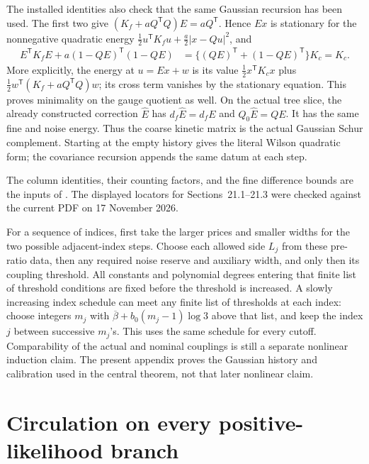 \documentclass[11pt,reqno]{amsart}
\numberwithin{equation}{section}
\theoremstyle{definition}
\theoremstyle{remark}
\begin{document}
The installed identities also check that the same Gaussian
recursion has been used. The first two give
\((K_f+aQ^{\mathsf T}Q)E=aQ^{\mathsf T}\). Hence \(Ex\) is stationary for
the nonnegative quadratic energy
\(\frac12u^{\mathsf T}K_fu+\frac a2|x-Qu|^2\), and
\begin{align*}
 E^{\mathsf T}K_fE+a(1-QE)^{\mathsf T}(1-QE)
 &=\{(QE)^{\mathsf T}+(1-QE)^{\mathsf T}\}K_c=K_c.
\end{align*}
More explicitly, the energy at \(u=Ex+w\) is its value
\(\frac12x^{\mathsf T}K_cx\) plus
\(\frac12w^{\mathsf T}(K_f+aQ^{\mathsf T}Q)w\); its cross term vanishes
by the stationary equation. This proves minimality on
the gauge quotient as well. On the actual tree slice,
the already constructed correction \(\widehat E\) has
\(d_f\widehat E=d_fE\) and \(Q_0\widehat E=QE\).
It has the same fine and noise energy. Thus the coarse
kinetic matrix is the actual Gaussian Schur complement.
Starting at the empty history gives the literal Wilson
quadratic form; the covariance recursion appends the
same datum at each step.

The column identities, their counting factors, and the
fine difference bounds are the inputs of
\cite[Proposition~21.3 and Section~21.3, pp.~111--112]{Main}.
The displayed locators for Sections~21.1--21.3 were checked
against the current PDF on 17 November 2026.

For a sequence of indices, first take the larger prices and
smaller widths for the two possible adjacent-index steps.
Choose each allowed side \(L_j\) from these pre-ratio data,
then any required noise reserve and auxiliary width, and only
then its coupling threshold. All constants and polynomial
degrees entering that finite list of threshold conditions
are fixed before the threshold is increased.
A slowly increasing index schedule can meet any finite list of
thresholds at each index: choose integers \(m_j\) with
\(\overline\beta+b_0(m_j-1)\log3\) above that list, and keep
the index \(j\) between successive \(m_j\)'s. This uses the
same schedule for every cutoff. Comparability of the actual and
nominal couplings is still a separate nonlinear induction claim.
The present appendix proves the Gaussian history and calibration
used in the central theorem, not that later nonlinear claim.


\section{Circulation on every positive-likelihood branch}
\label{app:packet-branches}
\end{document}
